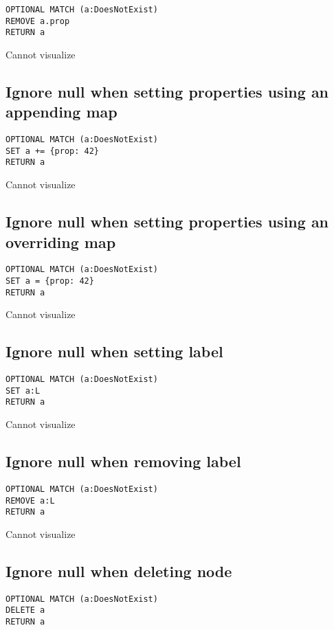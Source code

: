 \begin{lstlisting}
OPTIONAL MATCH (a:DoesNotExist)
REMOVE a.prop
RETURN a
\end{lstlisting}

Cannot visualize
\subsection{Ignore null when setting properties using an appending map}

\begin{lstlisting}
OPTIONAL MATCH (a:DoesNotExist)
SET a += {prop: 42}
RETURN a
\end{lstlisting}

Cannot visualize
\subsection{Ignore null when setting properties using an overriding map}

\begin{lstlisting}
OPTIONAL MATCH (a:DoesNotExist)
SET a = {prop: 42}
RETURN a
\end{lstlisting}

Cannot visualize
\subsection{Ignore null when setting label}

\begin{lstlisting}
OPTIONAL MATCH (a:DoesNotExist)
SET a:L
RETURN a
\end{lstlisting}

Cannot visualize
\subsection{Ignore null when removing label}

\begin{lstlisting}
OPTIONAL MATCH (a:DoesNotExist)
REMOVE a:L
RETURN a
\end{lstlisting}

Cannot visualize
\subsection{Ignore null when deleting node}

\begin{lstlisting}
OPTIONAL MATCH (a:DoesNotExist)
DELETE a
RETURN a
\end{lstlisting}

